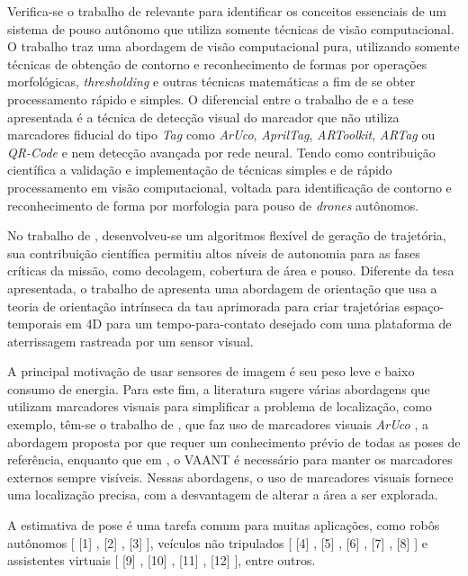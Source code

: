     Verifica-se o trabalho de \citet{Vidal2016} relevante para identificar os conceitos essenciais de um sistema de pouso autônomo que utiliza somente técnicas de visão computacional. O trabalho traz uma abordagem de visão computacional pura, utilizando somente técnicas de obtenção de contorno e reconhecimento de formas por operações morfológicas, \textit{thresholding} e outras técnicas matemáticas a fim de se obter processamento rápido e simples. O diferencial entre o trabalho de \citet{Vidal2016} e a tese apresentada é a técnica de detecção visual do marcador que não utiliza marcadores fiducial do tipo \textit{Tag} como \textit{ArUco}, \textit{AprilTag}, \textit{ARToolkit}, \textit{ARTag} ou \textit{QR-Code} e nem detecção avançada por rede neural. Tendo como contribuição científica a validação e implementação de técnicas simples e de rápido processamento em visão computacional, voltada para identificação de contorno e reconhecimento de forma por morfologia para pouso de \textit{drones} autônomos.
    
    No trabalho de \citet{Vetrella2017}, desenvolveu-se um algoritmos flexível de geração de trajetória, sua contribuição científica permitiu altos níveis de autonomia para as fases críticas da missão, como decolagem, cobertura de área e pouso. Diferente da tesa apresentada, o trabalho de \citet{Vetrella2017} apresenta uma abordagem de orientação que usa a teoria de orientação intrínseca da tau aprimorada para criar trajetórias espaço-temporais em 4D para um tempo-para-contato desejado com uma plataforma de aterrissagem rastreada por um sensor visual.
    
    A principal motivação de usar sensores de imagem é seu peso leve e baixo consumo de energia. Para este fim, a literatura sugere várias abordagens que utilizam marcadores visuais para simplificar a problema de localização, como exemplo, têm-se o trabalho de \citet{Pestana2016}, que faz uso de marcadores visuais \textit{ArUco} \citet{Salinas2013}, a abordagem proposta por \citet{Jayatilleke2013} que requer um conhecimento prévio de todas as poses de referência, enquanto que em \citet{Faigl2013}, o VAANT é necessário para manter os marcadores externos sempre visíveis. Nessas abordagens, o uso de marcadores visuais fornece uma localização precisa, com a desvantagem de alterar a área a ser explorada.
    
    A estimativa de pose é uma tarefa comum para muitas aplicações, como robôs autônomos [ [1] , [2] , [3] ], veículos não tripulados [ [4] , [5] , [6] , [7] , [8] ] e assistentes virtuais [ [9] , [10] , [11] , [12] ], entre outros.
    
